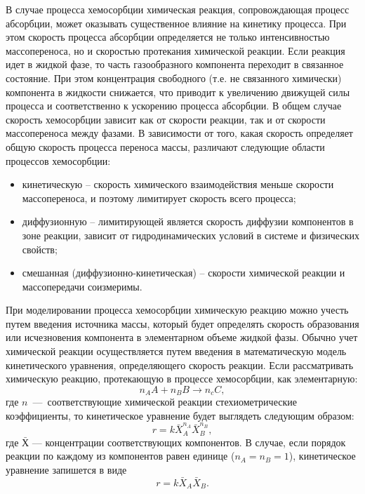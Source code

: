В случае процесса хемосорбции химическая реакция, сопровождающая процесс абсорбции, может оказывать существенное влияние на кинетику процесса. При этом скорость процесса абсорбции определяется не только интенсивностью массопереноса, но и скоростью протекания химической реакции. Если реакция идет в жидкой фазе, то часть газообразного компонента переходит в связанное состояние. При этом концентрация свободного (т.е. не связанного химически) компонента в жидкости снижается, что приводит к увеличению движущей силы процесса и соответственно к ускорению процесса абсорбции. В общем случае скорость хемосорбции зависит как от скорости реакции, так и от скорости массопереноса между фазами. В зависимости от того, какая скорость определяет общую скорость процесса переноса массы, различают следующие области процессов хемосорбции:
\begin{itemize}
	\item кинетическую – скорость химического взаимодействия меньше скорости массопереноса, и поэтому лимитирует скорость всего процесса;
	\item  диффузионную – лимитирующей является скорость диффузии компонентов в зоне реакции, зависит от гидродинамических условий в системе и физических свойств;
	\item смешанная (диффузионно-кинетическая) – скорости химической реакции и массопередачи соизмеримы.
\end{itemize}

При моделировании процесса хемосорбции химическую реакцию можно учесть путем введения источника массы, который будет определять скорость образования или исчезновения компонента в элементарном объеме жидкой фазы. Обычно учет химической реакции осуществляется путем введения в математическую модель кинетического уравнения, определяющего скорость реакции. Если рассматривать химическую реакцию, протекающую в процессе хемосорбции, как элементарную:
\begin{equation}
	n_A A + n_B B \rightarrow n_c C,
\end{equation}
где $n$ --- соответствующие химической реакции стехиометрические коэффициенты, то кинетическое уравнение будет выглядеть следующим образом:
\begin{equation} 
	r=k \bar{X}_A^{n_A} \bar{X}_B^{n_B},
\end{equation}
где $\bar{Х}$ --- концентрации соответствующих компонентов. В случае, если порядок реакции по каждому из компонентов равен единице ($n_A=n_B=1$),  кинетическое уравнение запишется в виде
\begin{equation}
r=k \bar{X}_A \bar{X}_B.
\end{equation}

